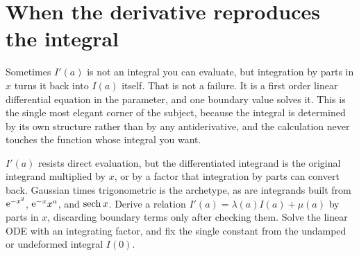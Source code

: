 \section{When the derivative reproduces the integral}

Sometimes $I'(a)$ is not an integral you can evaluate, but integration by parts in $x$ turns it back into $I(a)$ itself. That is not a failure. It is a first order linear differential equation in the parameter, and one boundary value solves it. This is the single most elegant corner of the subject, because the integral is determined by its own structure rather than by any antiderivative, and the calculation never touches the function whose integral you want.

\cue $I'(a)$ resists direct evaluation, but the differentiated integrand is the original integrand multiplied by $x$, or by a factor that integration by parts can convert back. Gaussian times trigonometric is the archetype, as are integrands built from $\mathrm{e}^{-x^{2}}$, $\mathrm{e}^{-x}x^{a}$, and $\operatorname{sech} x$.
\method Derive a relation $I'(a)=\lambda(a)I(a)+\mu(a)$ by parts in $x$, discarding boundary terms only after checking them. Solve the linear ODE with an integrating factor, and fix the single constant from the undamped or undeformed integral $I(0)$.

